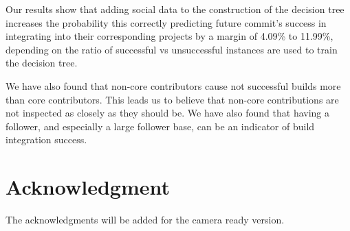 \documentclass[10pt, conference]{IEEEtran}
\begin{document}
Our results show that adding social data to the construction of the decision 
tree increases the probability this correctly predicting future commit's success 
in integrating into their corresponding projects by a margin of 4.09\% to 
11.99\%, depending on the ratio of successful vs unsuccessful instances are 
used to train the decision tree.


We have also found that non-core contributors cause not successful builds more
than core contributors.  This leads us to believe that non-core contributions
are not inspected as closely as they should be.  We have also found that having
a follower, and especially a large follower base, can be an indicator of build
integration success. 


\section*{Acknowledgment}

The acknowledgments will be added for the camera ready version.




%
%
%





\end{document}
